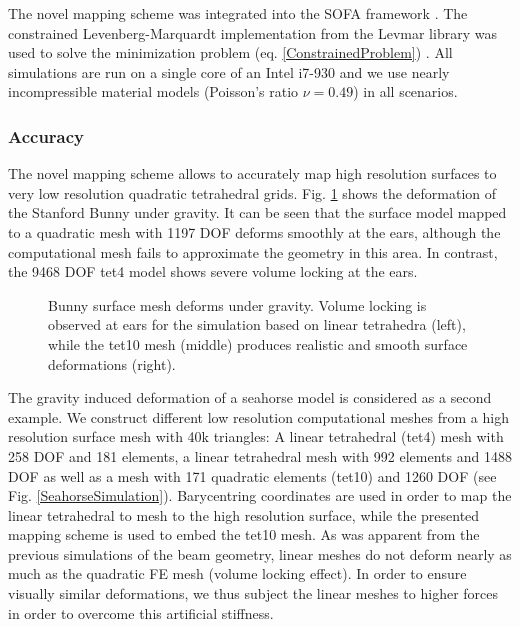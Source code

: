 The novel mapping scheme was integrated into the SOFA framework \cite{Faure2012}. The constrained Levenberg-Marquardt implementation from the Levmar library was used to solve the minimization problem (eq. \ref{ConstrainedProblem}) \cite{LourakisJul.2004}. All simulations are run on a single core of an Intel i7-930 and we use nearly incompressible material models (Poisson's ratio $\nu=0.49$) in all scenarios.


\subsubsection{Accuracy}

The novel mapping scheme allows to accurately map high resolution surfaces to very low resolution quadratic tetrahedral grids. Fig. \ref{BunnySimulation} shows the deformation of the Stanford Bunny under gravity. It can be seen that the surface model mapped to a quadratic mesh with 1197 DOF deforms smoothly at the ears, although the computational mesh fails to approximate the geometry in this area. In contrast, the 9468 DOF tet4 model shows severe volume locking at the ears.

\begin{figure}
   \centering   
	\caption{Bunny surface mesh deforms under gravity. Volume locking is observed at ears for the simulation based on linear tetrahedra (left), while the tet10 mesh (middle) produces realistic and smooth surface deformations (right).}
\label{BunnySimulation}
\end{figure}

The gravity induced deformation of a seahorse model is considered as a second example. We construct different low resolution computational meshes from a high resolution surface mesh with 40k triangles: A linear tetrahedral (tet4) mesh with 258 DOF and 181 elements, a linear tetrahedral mesh with 992 elements and 1488 DOF as well as a mesh with 171 quadratic elements (tet10) and 1260 DOF (see Fig. \ref{SeahorseSimulation}). Barycentring coordinates are used in order to map the linear tetrahedral to mesh to the high resolution surface, while the presented mapping scheme is used to embed the tet10 mesh. As was apparent from the previous simulations of the beam geometry, linear meshes do not deform nearly as much as the quadratic FE mesh (volume locking effect). In order to ensure visually similar deformations, we thus subject the linear meshes to higher forces in order to overcome this artificial stiffness. 

